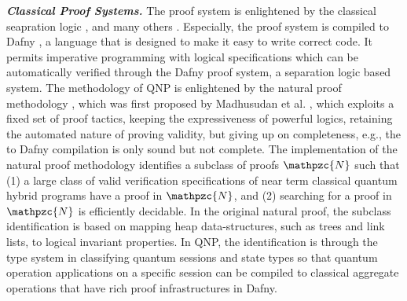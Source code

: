 \noindent\textbf{\textit{Classical Proof Systems.}}
The \qafny proof system is enlightened by the classical seapration logic \cite{separationlogic}, and many others \cite{10.1145/3453483.3454087,arxiv.1609.00919,10.1007/978-3-319-89960-2_13,10.1007/978-3-319-89960-2_2,nat-proof-fun}. Especially, the \qafny proof system is compiled to Dafny \cite{10.1007/978-3-642-17511-4_20}, a language that is designed to make it easy to write correct code. It permits imperative programming with logical specifications which can be automatically verified through the Dafny proof system, a separation logic based system. 
The methodology of QNP is enlightened by the natural proof methodology \cite{nat-proof-fun,nat-proof-frame,10.1145/2103621.2103673}, which  was first proposed by Madhusudan \textsf{et al.} \cite{nat-proof,10.1145/2103621.2103673}, which exploits a fixed set of proof tactics, keeping the expressiveness of powerful logics, retaining the
automated nature of proving validity, but giving up on completeness, e.g., the \qafny to Dafny compilation is only sound but not complete. 
The \qafny implementation of the natural proof methodology identifies a subclass of proofs $\mathpzc{N}$ such that
(1) a large class of valid verification specifications of near term classical quantum hybrid programs have a proof in $\mathpzc{N}$, 
and (2) searching for a proof in $\mathpzc{N}$ is efficiently decidable. 
In the original natural proof, the subclass identification is based on mapping heap data-structures, such as trees and link lists, to logical invariant properties. In QNP, the identification is through the \qafny type system in classifying quantum sessions and state types so that quantum operation applications on a specific session can be compiled to classical aggregate operations that have rich proof infrastructures in Dafny. 



